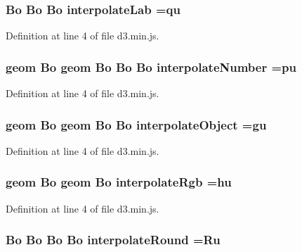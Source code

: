 \subsubsection[{interpolate\+Lab}]{ {\bf Bo} {\bf Bo} {\bf Bo} interpolate\+Lab ={\bf qu}}\label{d3_8min_8js_aa172c7e21299214a8f3572b93a868e0d}


Definition at line 4 of file d3.\+min.\+js.

\subsubsection[{interpolate\+Number}]{ geom {\bf Bo} geom {\bf Bo} {\bf Bo} {\bf Bo} interpolate\+Number ={\bf pu}}\label{d3_8min_8js_a089c9dd7c6e21e4f2bb521f18f7a7437}


Definition at line 4 of file d3.\+min.\+js.

\subsubsection[{interpolate\+Object}]{ geom {\bf Bo} geom {\bf Bo} {\bf Bo} interpolate\+Object ={\bf gu}}\label{d3_8min_8js_a36fdbd263ea2622de38845f26252a400}


Definition at line 4 of file d3.\+min.\+js.

\subsubsection[{interpolate\+Rgb}]{ geom {\bf Bo} geom {\bf Bo} interpolate\+Rgb ={\bf hu}}\label{d3_8min_8js_a05a3a28ebd3bf99639c60b9a2a7ea1ea}


Definition at line 4 of file d3.\+min.\+js.

\subsubsection[{interpolate\+Round}]{ {\bf Bo} {\bf Bo} {\bf Bo} {\bf Bo} interpolate\+Round ={\bf Ru}}\label{d3_8min_8js_aafda64d8bab130f5426d7a462cf8f74a}


